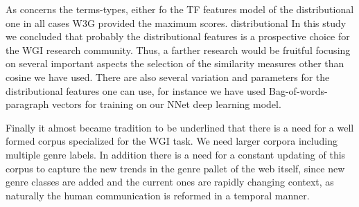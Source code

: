 \documentclass[runningheads]{llncs}
\begin{document}
As concerns the terms-types, either fo the TF features model of the distributional one in all cases W3G provided the maximum scores.
distributional
In this study we concluded that probably the distributional features is a prospective choice for the WGI research community. Thus, a farther research would be fruitful focusing on several important aspects the selection of the similarity measures other than cosine we have used. There are also several variation and parameters for the distributional features one can use, for instance we have used Bag-of-words-paragraph vectors for training on our NNet deep learning model.

Finally it almost became tradition to be underlined that there is a need for a well formed corpus specialized for the WGI task. We need larger corpora including multiple genre labels. In addition there is a need for a constant updating of this corpus to capture the new trends in the genre pallet of the web itself, since new genre classes are added and the current ones are rapidly changing context, as naturally the human communication is reformed in a temporal manner.



\end{document}
